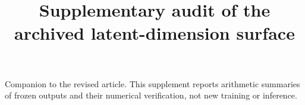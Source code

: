 \documentclass{rQUF2e}
\begin{document}
\title{Supplementary audit of the archived latent-dimension surface}
\maketitle
\noindent Companion to the revised article. This supplement reports arithmetic summaries of frozen outputs and their numerical verification, not new training or inference.
\setcounter{table}{0}\renewcommand{\thetable}{S\arabic{table}}

\end{document}
